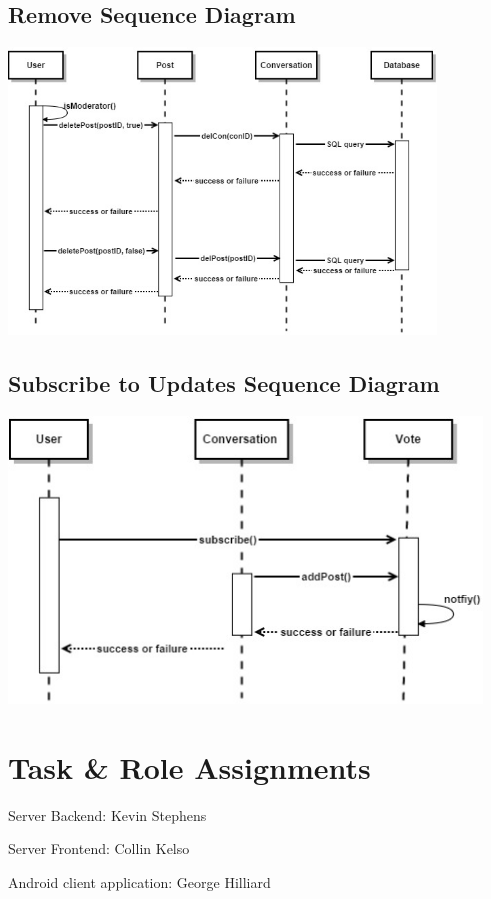\documentclass[11pt]{scrartcl}
\let\stdsection\section
\renewcommand\section{\newpage\stdsection}
\begin{document}
\newpage

    \subsection{Remove Sequence Diagram}
        \centerline{\includegraphics[width=\textwidth,height=3in,keepaspectratio]{diagrams/delete-SEQ.png}}

    \subsection{Subscribe to Updates Sequence Diagram}
        \centerline{\includegraphics[width=\textwidth,height=3in,keepaspectratio]{diagrams/subscribe-SEQ.png}}

\appendix


\clearpage
\section{Task \& Role Assignments}
    \begin{description*}
        \item[Server Backend:] Kevin Stephens
        \item[Server Frontend:] Collin Kelso
        \item[Android client application:] George Hilliard
    \end{description*}
\end{document}
